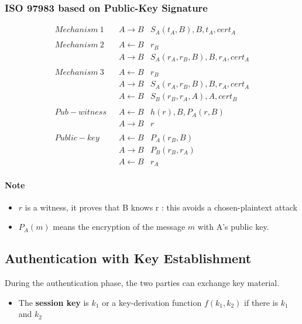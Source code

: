 \subsubsection{ISO 9798\text{-}3 based on Public-Key Signature}
\begin{eqnarray*}
    Mechanism~1 \quad & A \rightarrow B & S_A(t_A,B),B,t_A,cert_A \\
    \\
    Mechanism~2 \quad & A \leftarrow B & r_B\\
                      & A \rightarrow B &
    S_A(r_A,r_B,B),B,r_A,cert_A \\
    \\
    Mechanism~3 \quad & A \leftarrow B & r_B \\
                      & A \rightarrow B &
    S_A(r_A,r_B,B),B,r_A,cert_A \\
    & A \leftarrow B & S_B(r_B, r_A, A), A, cert_B \\
    \\
    Pub-witness & A \leftarrow B & h(r), B, P_A(r, B) \\
    & A \rightarrow B & r \\
    \\
    Public-key & A \leftarrow B & P_A(r_B, B) \\
                                    & A \rightarrow B & P_B(r_B, r_A)\\
                                    & A \leftarrow B & r_A
\end{eqnarray*}

\paragraph{Note} 
\begin{itemize}
    \item $r$ is a witness, it proves that B knows r : this avoids a
        chosen-plaintext attack
    \item $P_A(m)$ means the
        encryption of the message $m$ with A’s public key.
\end{itemize}


\subsection{Authentication with Key Establishment}
During the authentication phase, the two parties can exchange key
material.

\begin{itemize}
    \item The \textbf{session key} is $k_1$ or a key-derivation function  
        $f(k_1,k_2)$ if there is $k_1$ and $k_2$
\end{itemize}

